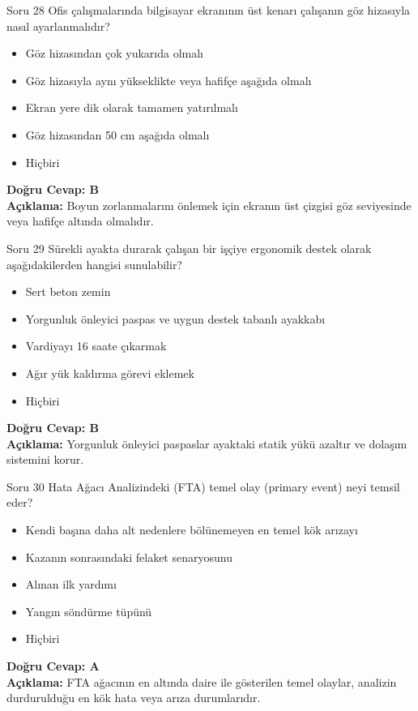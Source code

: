 \documentclass[12pt,a4paper]{article}
\begin{document}
\begin{testcard}{Soru 28}
    Ofis çalışmalarında bilgisayar ekranının üst kenarı çalışanın göz hizasıyla nasıl ayarlanmalıdır?
    \begin{itemize}
        \item[A)] Göz hizasından çok yukarıda olmalı
        \item[B)] Göz hizasıyla aynı yükseklikte veya hafifçe aşağıda olmalı
        \item[C)] Ekran yere dik olarak tamamen yatırılmalı
        \item[D)] Göz hizasından 50 cm aşağıda olmalı
        \item[E)] Hiçbiri
    \end{itemize}
    \tcblower
    \textbf{Doğru Cevap: B} \\
    \textbf{Açıklama:} Boyun zorlanmalarını önlemek için ekranın üst çizgisi göz seviyesinde veya hafifçe altında olmalıdır.
\end{testcard}

\begin{testcard}{Soru 29}
    Sürekli ayakta durarak çalışan bir işçiye ergonomik destek olarak aşağıdakilerden hangisi sunulabilir?
    \begin{itemize}
        \item[A)] Sert beton zemin
        \item[B)] Yorgunluk önleyici paspas ve uygun destek tabanlı ayakkabı
        \item[C)] Vardiyayı 16 saate çıkarmak
        \item[D)] Ağır yük kaldırma görevi eklemek
        \item[E)] Hiçbiri
    \end{itemize}
    \tcblower
    \textbf{Doğru Cevap: B} \\
    \textbf{Açıklama:} Yorgunluk önleyici paspaslar ayaktaki statik yükü azaltır ve dolaşım sistemini korur.
\end{testcard}

\begin{testcard}{Soru 30}
    Hata Ağacı Analizindeki (FTA) temel olay (primary event) neyi temsil eder?
    \begin{itemize}
        \item[A)] Kendi başına daha alt nedenlere bölünemeyen en temel kök arızayı
        \item[B)] Kazanın sonrasındaki felaket senaryosunu
        \item[C)] Alınan ilk yardımı
        \item[D)] Yangın söndürme tüpünü
        \item[E)] Hiçbiri
    \end{itemize}
    \tcblower
    \textbf{Doğru Cevap: A} \\
    \textbf{Açıklama:} FTA ağacının en altında daire ile gösterilen temel olaylar, analizin durdurulduğu en kök hata veya arıza durumlarıdır.
\end{testcard}
\end{document}
